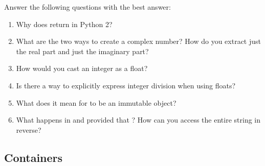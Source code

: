 \begin{problem}
Answer the following questions with the best answer:

\begin{enumerate}
\item Why does  return  in Python 2? 
\item What are the two ways to create a complex number? 
How do you extract just the real part and just the imaginary part?
\item How would you cast an integer as a float?
\item Is there a way to explicitly express integer division when using floats?
\item What does it mean for  to be an immutable object? 
\item What happens in  and  provided 
that ? 
How can you access the entire string in reverse?

\end{enumerate}
\end{problem}


\subsection*{Containers}

